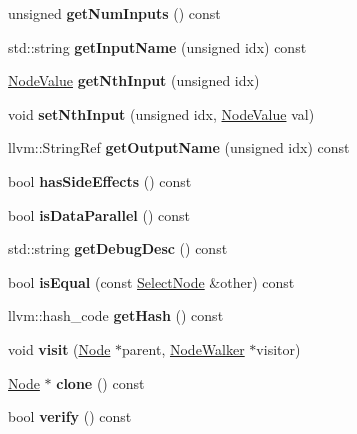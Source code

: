 \begin{DoxyCompactItemize}
unsigned {\bfseries get\+Num\+Inputs} () const
\item 
\mbox{\label{classglow_1_1_select_node_a52ae339fd8bd04c83b8775bffeede330}} 
std\+::string {\bfseries get\+Input\+Name} (unsigned idx) const
\item 
\mbox{\label{classglow_1_1_select_node_a3c93c86813f8bcb5ed592673abf70949}} 
\hyperlink{structglow_1_1_node_value}{Node\+Value} {\bfseries get\+Nth\+Input} (unsigned idx)
\item 
\mbox{\label{classglow_1_1_select_node_a281b0eff171eeb4131ce68a359dcfb4d}} 
void {\bfseries set\+Nth\+Input} (unsigned idx, \hyperlink{structglow_1_1_node_value}{Node\+Value} val)
\item 
\mbox{\label{classglow_1_1_select_node_a20943570eb5f0a62f282abcdd5b7bd31}} 
llvm\+::\+String\+Ref {\bfseries get\+Output\+Name} (unsigned idx) const
\item 
\mbox{\label{classglow_1_1_select_node_ab7b96ede20ccf831a91b749dfb4fd575}} 
bool {\bfseries has\+Side\+Effects} () const
\item 
\mbox{\label{classglow_1_1_select_node_a5ff87783eeb17c42bdfe0cff85e6dd25}} 
bool {\bfseries is\+Data\+Parallel} () const
\item 
\mbox{\label{classglow_1_1_select_node_a68e9d2039465ff26ed6d291e673ee636}} 
std\+::string {\bfseries get\+Debug\+Desc} () const
\item 
\mbox{\label{classglow_1_1_select_node_a8dc331dd997f0d407d0a600ccd19c058}} 
bool {\bfseries is\+Equal} (const \hyperlink{classglow_1_1_select_node}{Select\+Node} \&other) const
\item 
\mbox{\label{classglow_1_1_select_node_a3fdd5103d34eafcf14d8328198352493}} 
llvm\+::hash\+\_\+code {\bfseries get\+Hash} () const
\item 
\mbox{\label{classglow_1_1_select_node_ae09c01fb3f57356c2dbc67fc622adcde}} 
void {\bfseries visit} (\hyperlink{classglow_1_1_node}{Node} $\ast$parent, \hyperlink{classglow_1_1_node_walker}{Node\+Walker} $\ast$visitor)
\item 
\mbox{\label{classglow_1_1_select_node_aa8a89a2f32be5940d5ba4f0e5c7d28aa}} 
\hyperlink{classglow_1_1_node}{Node} $\ast$ {\bfseries clone} () const
\item 
\mbox{\label{classglow_1_1_select_node_adc09f712b6ae30ac007ce534e833cc22}} 
bool {\bfseries verify} () const
\end{DoxyCompactItemize}
